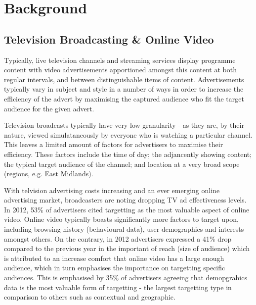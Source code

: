 \section{Background}

	\subsection{Television Broadcasting \& Online Video}

	Typically, live television channels and streaming services display programme content with video advertisements apportioned amongst this content at both regular intervals, and between distinguishable items of content. Advertisements typically vary in subject and style in a number of ways in order to increase the efficiency of the advert by maximising the captured audience who fit the target audience for the given advert.

	Television broadcasts typically have very low granularity - as they are, by their nature, viewed simulataneously by everyone who is watching a particular channel. This leaves a limited amount of factors for advertisers to maximise their efficiency. These factors include the time of day; the adjancently showing content; the typical target audience of the channel; and location at a very broad scope (regions, e.g. East Midlands).

	With telvision advertising costs increasing and an ever emerging online advertising market, broadcasters are noting dropping TV ad effectiveness levels. In 2012, 53\% of advertisers cited targetting as the most valuable aspect of online video. Online video typically boasts significantly more factors to target upon, including browsing history (behavioural data), user demographics and interests amongst others. On the contrary, in 2012 advertisers expressed a 41\% drop compared to the previous year in the important of reach (size of audience) which is attributed to an increase comfort that online video has a large enough audience, which in turn emphasises the importance on targetting specific audiences. This is emphasised by 35\% of advertisers agreeing that demopgrahics data is the most valuable form of targetting - the largest targetting type in comparison to others such as contextual and geographic. \citep{brightroll-report}


